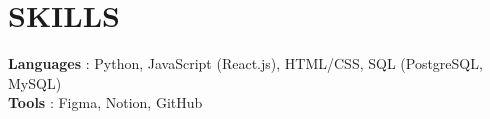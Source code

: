 \documentclass[letterpaper,11pt]{article}
\begin{document}
%
\section{SKILLS}
 \begin{itemize}[leftmargin=0in, label={}]
    \small{\item{
     \textbf{Languages} {: Python, JavaScript (React.js), HTML/CSS, SQL (PostgreSQL, MySQL)}\vspace{2pt} \\
     \textbf{Tools}     {: Figma, Notion, GitHub}
    }}
 \end{itemize}


\end{document}
